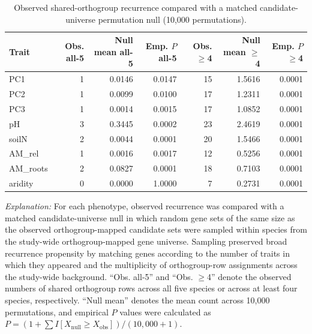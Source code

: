\begin{table}[t]
\caption{Observed shared-orthogroup recurrence compared with a matched candidate-universe permutation null (10{,}000 permutations).}
\label{tab:orthogroup_null_permutation_summary}
\centering
\small
\begin{tabular}{lrrrrrr}
\toprule
Trait & Obs. all-5 & Null mean all-5 & Emp. $P$ all-5 & Obs. $\geq$4 & Null mean $\geq$4 & Emp. $P$ $\geq$4 \\
\midrule
PC1      & 1 & 0.0146 & 0.0147 & 15 & 1.5616 & 0.0001 \\
PC2      & 1 & 0.0099 & 0.0100 & 17 & 1.2311 & 0.0001 \\
PC3      & 1 & 0.0014 & 0.0015 & 17 & 1.0852 & 0.0001 \\
pH       & 3 & 0.3445 & 0.0002 & 23 & 2.4619 & 0.0001 \\
soilN    & 2 & 0.0044 & 0.0001 & 20 & 1.5466 & 0.0001 \\
AM\_rel   & 1 & 0.0016 & 0.0017 & 12 & 0.5256 & 0.0001 \\
AM\_roots & 2 & 0.0827 & 0.0001 & 18 & 0.7103 & 0.0001 \\
aridity  & 0 & 0.0000 & 1.0000 &  7 & 0.2731 & 0.0001 \\
\bottomrule
\end{tabular}

\vspace{4pt}
\parbox{0.96\linewidth}{\footnotesize
\textit{Explanation:} For each phenotype, observed recurrence was compared with a matched candidate-universe null in which random gene sets of the same size as the observed orthogroup-mapped candidate sets were sampled within species from the study-wide orthogroup-mapped gene universe. Sampling preserved broad recurrence propensity by matching genes according to the number of traits in which they appeared and the multiplicity of orthogroup-row assignments across the study-wide background. ``Obs. all-5'' and ``Obs. $\geq$4'' denote the observed numbers of shared orthogroup rows across all five species or across at least four species, respectively. ``Null mean'' denotes the mean count across 10{,}000 permutations, and empirical $P$ values were calculated as $P = (1 + \sum I[X_{\mathrm{null}} \geq X_{\mathrm{obs}}])/(10{,}000+1)$.}
\end{table}

